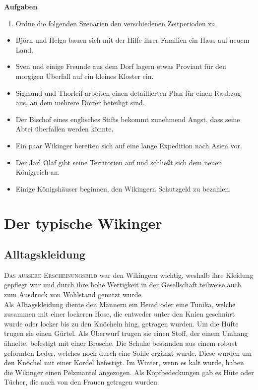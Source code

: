 \documentclass[12pt,a4paper,ngerman,openany]{book}
\newcommand{\flettrine}[2]{\lettrine[lines=2, depth=0, loversize=0.25, nindent=0.69pt, lraise=0.15]{\initfamily{#1}}{#2}}
\newcommand*\initfamily{\usefont{U}{GotIn}{xl}{n}}
\newcommand{\aufgaben}[1]{
  \begin{tcolorbox}
    \textbf{Aufgaben}
    \begin{enumerate}
      #1
    \end{enumerate}
  \end{tcolorbox}
} %
\newcommand{\fchapter}[1]{\chapter{#1}\thispagestyle{chapterstyle}}
\begin{document}
\vspace{0.66cm}

\aufgaben{
  \item Ordne die folgenden Szenarien den verschiedenen Zeitperioden zu.
}

\begin{itemize}
\item Björn und Helga bauen sich mit der Hilfe ihrer Familien ein Haus auf neuem Land.
\item Sven und einige Freunde aus dem Dorf lagern etwas Proviant für den morgigen Überfall auf ein kleines Kloster ein.
\item Sigmund und Thorleif arbeiten einen detaillierten Plan für einen Raubzug aus, an dem mehrere Dörfer beteiligt sind.
\item Der Bischof eines englisches Stifts bekommt zunehmend Angst, dass seine Abtei überfallen werden könnte.
\item Ein paar Wikinger bereiten sich auf eine lange Expedition nach Asien vor.
\item Der Jarl Olaf gibt seine Territorien auf und schließt sich dem neuen Königreich an.
\item Einige Königshäuser beginnen, den Wikingern Schutzgeld zu bezahlen.
\end{itemize}

\fchapter{Der typische Wikinger}

\section{Alltagskleidung}
\flettrine{D}{Das äussere Erscheinungsbild} war den Wikingern wichtig, weshalb ihre Kleidung gepflegt war und durch ihre hohe Wertigkeit in der Gesellschaft teilweise auch zum Ausdruck von Wohlstand genutzt wurde.\\
Als Alltagskleidung diente den Männern ein Hemd oder eine Tunika, welche zusammen mit einer lockeren Hose, die entweder unter den Knien geschnürt wurde oder locker bis zu den Knöcheln hing, getragen wurden. Um die Hüfte trugen sie einen Gürtel. Als Überwurf trugen sie einen Stoff, der einem Umhang ähnelte, befestigt mit einer Brosche. Die Schuhe bestanden aus einem robust geformten Leder, welches noch durch eine Sohle ergänzt wurde. Diese wurden um den Knöchel mit einer Kordel befestigt. Im Winter, wenn es kalt wurde, haben die Wikinger einen Pelzmantel angezogen. Als Kopfbedeckungen gab es Hüte oder Tücher, die auch von den Frauen getragen wurden.
\end{document}
